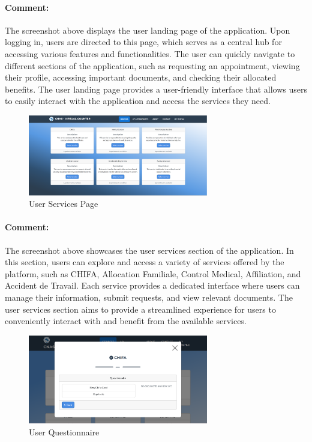\begin{itemize}
\paragraph{Comment:} The screenshot above displays the user landing page of the application. Upon logging in, users are directed to this page, which serves as a central hub for accessing various features and functionalities. The user can quickly navigate to different sections of the application, such as requesting an appointment, viewing their profile, accessing important documents, and checking their allocated benefits. The user landing page provides a user-friendly interface that allows users to easily interact with the application and access the services they need.

\begin{figure}[htbp]
    \centering
    \includegraphics[width=0.7\textwidth]{SCREENSHOTS/user/services.png}
    \caption{User Services Page}
    \label{fig:user-services}
\end{figure}
\paragraph{Comment:} The screenshot above showcases the user services section of the application. In this section, users can explore and access a variety of services offered by the platform, such as CHIFA, Allocation Familiale, Control Medical, Affiliation, and Accident de Travail. Each service provides a dedicated interface where users can manage their information, submit requests, and view relevant documents. The user services section aims to provide a streamlined experience for users to conveniently interact with and benefit from the available services.
\newpage


\begin{figure}[htbp]
    \centering
    \includegraphics[width=0.7\textwidth]{SCREENSHOTS/user/questionnaire.png}
    \caption{User Questionnaire}
    \label{fig:user-questionnaire}
\end{figure}

\end{itemize}
